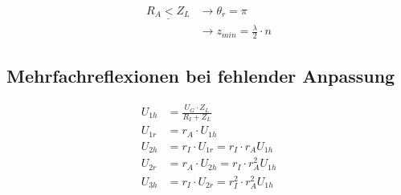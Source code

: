 \begin{align*}
    \underline{R_A < Z_L} & \rightarrow\theta_r = \pi                      \\
     & \rightarrow z_{min}=\frac{\lambda}{2}\cdot n
\end{align*}

\subsection{Mehrfachreflexionen bei fehlender Anpassung}


\begin{align*}
    U_{1h} & = \frac{U_G\cdot Z_L}{R_I + Z_L}            \\
    U_{1r} & = r_A\cdot U_{1h}                           \\
    U_{2h} & = r_I\cdot U_{1r} = r_I\cdot r_A U_{1h}     \\
    U_{2r} & = r_A\cdot U_{2h} = r_I\cdot r_A^2 U_{1h}   \\
    U_{3h} & = r_I\cdot U_{2r} = r_I^2\cdot r_A^2 U_{1h}
\end{align*}

